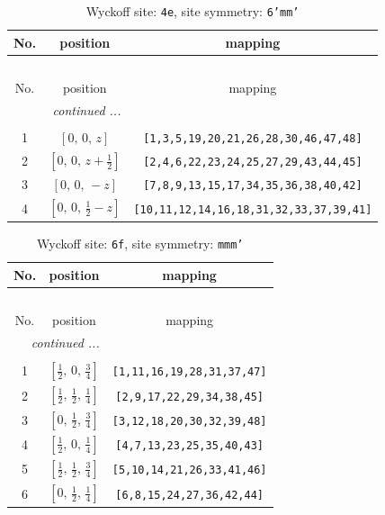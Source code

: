 \documentclass[fleqn,8pt]{jsarticle}
\begin{document}
\renewcommand{\arraystretch}{1.2}
\begin{longtable}{ccc}
\caption{Wyckoff site: {\tt 4e}, site symmetry: {\tt 6'mm'}}
 \\
 \hline \hline
No. & position & mapping \\ \hline \endfirsthead

\multicolumn{2}{l}{\tablename\ \thetable{}} \\
 \hline \hline
No. & position & mapping \\ \hline \endhead

 \hline \hline
\multicolumn{2}{r}{\footnotesize\it continued ...} \\ \endfoot

 \hline \hline
\multicolumn{2}{r}{} \\ \endlastfoot

1 & $\left[ 0,\, 0,\, z \right]$ & {\tt [1,3,5,19,20,21,26,28,30,46,47,48]} \\ \hline
2 & $\left[ 0,\, 0,\, z + \frac{1}{2} \right]$ & {\tt [2,4,6,22,23,24,25,27,29,43,44,45]} \\ \hline
3 & $\left[ 0,\, 0,\, - z \right]$ & {\tt [7,8,9,13,15,17,34,35,36,38,40,42]} \\ \hline
4 & $\left[ 0,\, 0,\, \frac{1}{2} - z \right]$ & {\tt [10,11,12,14,16,18,31,32,33,37,39,41]} \\
\end{longtable}
\renewcommand{\arraystretch}{1.2}
\begin{longtable}{ccc}
\caption{Wyckoff site: {\tt 6f}, site symmetry: {\tt mmm'}}
 \\
 \hline \hline
No. & position & mapping \\ \hline \endfirsthead

\multicolumn{2}{l}{\tablename\ \thetable{}} \\
 \hline \hline
No. & position & mapping \\ \hline \endhead

 \hline \hline
\multicolumn{2}{r}{\footnotesize\it continued ...} \\ \endfoot

 \hline \hline
\multicolumn{2}{r}{} \\ \endlastfoot

1 & $\left[ \frac{1}{2},\, 0,\, \frac{3}{4} \right]$ & {\tt [1,11,16,19,28,31,37,47]} \\ \hline
2 & $\left[ \frac{1}{2},\, \frac{1}{2},\, \frac{1}{4} \right]$ & {\tt [2,9,17,22,29,34,38,45]} \\ \hline
3 & $\left[ 0,\, \frac{1}{2},\, \frac{3}{4} \right]$ & {\tt [3,12,18,20,30,32,39,48]} \\ \hline
4 & $\left[ \frac{1}{2},\, 0,\, \frac{1}{4} \right]$ & {\tt [4,7,13,23,25,35,40,43]} \\ \hline
5 & $\left[ \frac{1}{2},\, \frac{1}{2},\, \frac{3}{4} \right]$ & {\tt [5,10,14,21,26,33,41,46]} \\ \hline
6 & $\left[ 0,\, \frac{1}{2},\, \frac{1}{4} \right]$ & {\tt [6,8,15,24,27,36,42,44]} \\
\end{longtable}
\end{document}
